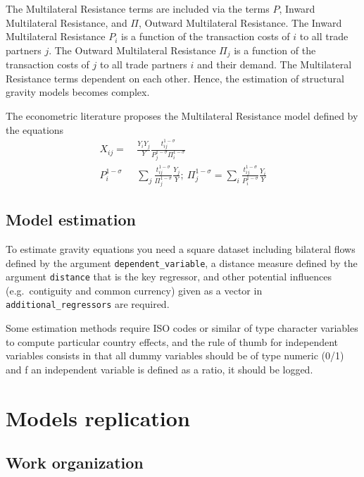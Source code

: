 \documentclass[12pt,reqno,oneside,pdftex]{formato-puc/puctesis} %
\begin{document}
The Multilateral Resistance terms are included via the terms \(P\),
Inward Multilateral Resistance, and \(\Pi\), Outward Multilateral
Resistance. The Inward Multilateral Resistance \(P_i\) is a function of
the transaction costs of \(i\) to all trade partners \(j\). The Outward
Multilateral Resistance \(\Pi_{j}\) is a function of the transaction
costs of \(j\) to all trade partners \(i\) and their demand. The
Multilateral Resistance terms dependent on each other. Hence, the
estimation of structural gravity models becomes complex.

The econometric literature proposes the Multilateral Resistance model
defined by the equations \begin{align*}
X_{ij} =& \frac{Y_{i}Y_{j}}{Y}\frac{t_{ij}^{1-\sigma}}{P_{j}^{1-\sigma}\Pi_{i}^{1-\sigma}}\\
P_{i}^{1-\sigma} \text{ }& \sum_{j}\frac{t_{ij}^{1-\sigma}}{\Pi_{j}^{1-\sigma}}\frac{Y_{j}}{Y};\:\Pi_{j}^{1-\sigma}=\sum_{i}\frac{t_{ij}^{1-\sigma}}{P_{i}^{1-\sigma}}\frac{Y_{i}}{Y}
\end{align*}

\hypertarget{model-estimation}{%
\subsection{Model estimation}\label{model-estimation}}

To estimate gravity equations you need a square dataset including
bilateral flows defined by the argument \texttt{dependent\_variable}, a
distance measure defined by the argument \texttt{distance} that is the
key regressor, and other potential influences (e.g.~contiguity and
common currency) given as a vector in \texttt{additional\_regressors}
are required.

Some estimation methods require ISO codes or similar of type character
variables to compute particular country effects, and the rule of thumb
for independent variables consists in that all dummy variables should be
of type numeric (0/1) and f an independent variable is defined as a
ratio, it should be logged.

\hypertarget{models-replication}{%
\section{Models replication}\label{models-replication}}

\hypertarget{work-organization}{%
\subsection{Work organization}\label{work-organization}}
\end{document}
